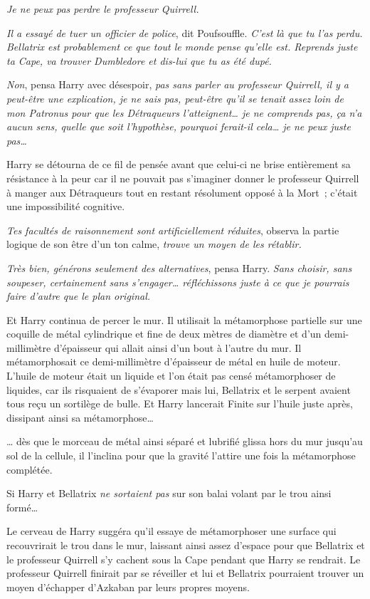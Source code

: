 \emph{Je ne peux pas perdre le professeur Quirrell.}

\emph{Il a essayé de tuer un officier de police}, dit Poufsouffle. \emph{C'est là que tu l'as perdu. Bellatrix est probablement ce que tout le monde pense qu'elle est. Reprends juste ta Cape, va trouver Dumbledore et dis-lui que tu as été dupé.}

\emph{Non}, pensa Harry avec désespoir, \emph{pas sans parler au professeur Quirrell, il y a peut-être une explication, je ne sais pas, peut-être qu'il se tenait assez loin de mon Patronus pour que les Détraqueurs l'atteignent… je ne comprends pas, ça n'a aucun sens, quelle que soit l'hypothèse, pourquoi ferait-il cela… je ne peux juste pas…}

Harry se détourna de ce fil de pensée avant que celui-ci ne brise entièrement sa résistance à la peur car il ne pouvait pas s'imaginer donner le professeur Quirrell à manger aux Détraqueurs tout en restant résolument opposé à la Mort~; c'était une impossibilité cognitive.

\emph{Tes facultés de raisonnement sont artificiellement réduites}, observa la partie logique de son être d'un ton calme, \emph{trouve un moyen de les rétablir.}

\emph{Très bien, générons seulement des alternatives}, pensa Harry. \emph{Sans choisir, sans soupeser, certainement sans s'engager… réfléchissons juste à ce que je pourrais faire d'autre que le plan original.}

Et Harry continua de percer le mur. Il utilisait la métamorphose partielle sur une coquille de métal cylindrique et fine de deux mètres de diamètre et d'un demi-millimètre d'épaisseur qui allait ainsi d'un bout à l'autre du mur. Il métamorphosait ce demi-millimètre d'épaisseur de métal en huile de moteur. L'huile de moteur était un liquide et l'on était pas censé métamorphoser de liquides, car ils risquaient de s'évaporer mais lui, Bellatrix et le serpent avaient tous reçu un sortilège de bulle. Et Harry lancerait Finite sur l'huile juste après, dissipant ainsi sa métamorphose…

… dès que le morceau de métal ainsi séparé et lubrifié glissa hors du mur jusqu'au sol de la cellule, il l'inclina pour que la gravité l'attire une fois la métamorphose complétée.

Si Harry et Bellatrix \emph{ne sortaient pas} sur son balai volant par le trou ainsi formé…

Le cerveau de Harry suggéra qu'il essaye de métamorphoser une surface qui recouvrirait le trou dans le mur, laissant ainsi assez d'espace pour que Bellatrix et le professeur Quirrell s'y cachent sous la Cape pendant que Harry se rendrait. Le professeur Quirrell finirait par se réveiller et lui et Bellatrix pourraient trouver un moyen d'échapper d'Azkaban par leurs propres moyens.

